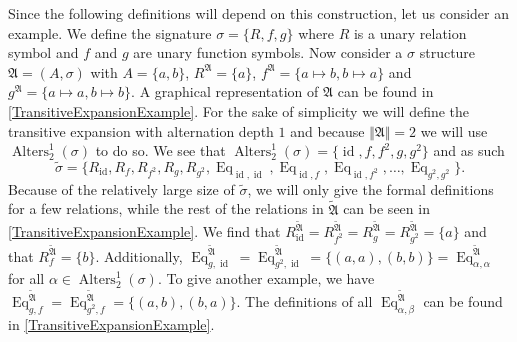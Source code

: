 \documentclass[a4paper,11pt,DIV=15]{scrartcl} %
\theoremstyle{plain}
\theoremstyle{definition}
\begin{document}
Since the following definitions will depend on this construction, let us consider an example.
We define the signature $\sigma=\{R,f,g\}$ where $R$ is a unary relation symbol and $f$ and $g$ are unary function symbols.
Now consider a $\sigma$ structure $\mathfrak A=(A,\sigma)$ with $A=\{a,b\}$, $R^{\mathfrak A}=\{a\}$, $f^{\mathfrak A}=\{a\mapsto b, b\mapsto a\}$ and $g^{\mathfrak A}=\{a\mapsto a, b\mapsto b\}$.
A graphical representation of $\mathfrak A$ can be found in \cref{TransitiveExpansionExample}.
For the sake of simplicity we will define the transitive expansion with alternation depth $1$ and because $\Vert\mathfrak A\Vert=2$ we will use $\operatorname{Alters}^1_2(\sigma)$ to do so.
We see that $\operatorname{Alters}^1_2(\sigma)=\{\operatorname{id}, f,f^2,g,g^2\}$ and as such 
$$\widetilde{\sigma}=\{R_{\operatorname{id}}, R_{f}, R_{f^2}, R_g, R_{g^2}, \operatorname{Eq}_{\operatorname{id},\operatorname{id}}, \operatorname{Eq}_{\operatorname{id},f}, \operatorname{Eq}_{\operatorname{id}, f^2}, \dots, \operatorname{Eq}_{g^2, g^2}\}.$$
Because of the relatively large size of $\widetilde{\sigma}$, we will only give the formal definitions for a few relations, while the rest of the relations in $\widetilde{\mathfrak A}$ can be seen in \cref{TransitiveExpansionExample}.
We find that $R^{\widetilde{\mathfrak A}}_{\operatorname{id}}=R^{\widetilde{\mathfrak A}}_{f^2}=R^{\widetilde{\mathfrak A}}_g=R^{\widetilde{\mathfrak A}}_{g^2}=\{a\}$ and that $R^{\widetilde{\mathfrak A}}_f=\{b\}$.
Additionally, $\operatorname{Eq}^{\widetilde{\mathfrak A}}_{g,\operatorname{id}}=\operatorname{Eq}^{\widetilde{\mathfrak A}}_{g^2,\operatorname{id}}=\{(a,a),(b,b)\}=\operatorname{Eq}^{\widetilde{\mathfrak A}}_{\alpha,\alpha}$ for all $\alpha\in\operatorname{Alters}^1_2(\sigma)$.
To give another example, we have $\operatorname{Eq}^{\widetilde{\mathfrak A}}_{g,f}=\operatorname{Eq}^{\widetilde{\mathfrak A}}_{g^2,f}=\{(a,b),(b,a)\}$.
The definitions of all $\operatorname{Eq}^{\widetilde{\mathfrak A}}_{\alpha,\beta}$ can be found in \cref{TransitiveExpansionExample}.
\end{document}
